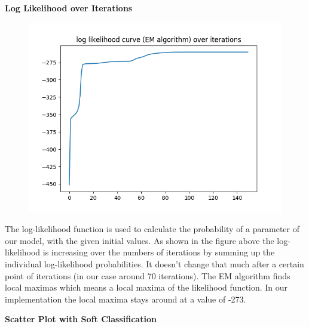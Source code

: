 \documentclass[a4paper]{article}
\begin{document}
\begin{enumerate}
{\large \textbf{Log Likelihood over Iterations}} \\


\begin{figure}[htp]
\centering
\includegraphics[scale=0.5]{plots/LL_scenario1_cmpnt3.png}
  \label{fig:17}
\end{figure}

The log-likelihood function is used to calculate the probability of a parameter of our model, with the given initial values. As shown in the figure above the log-likelihood is increasing over the numbers of iterations by summing up the individual log-likelihood probabilities. It doesn't change that much after a certain point of iterations (in our case around 70 iterations). The EM algorithm finds local maximas which means a local maxima of the likelihood function. In our implementation the local maxima stays around at a value of -273.\newline

\newpage
{\large \textbf{Scatter Plot with Soft Classification}} \\



\end{enumerate}
\end{document}
